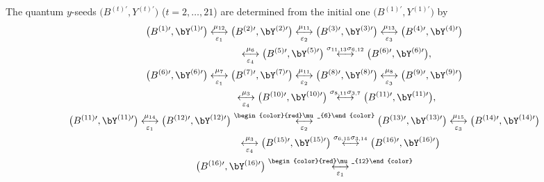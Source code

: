 The quantum $y$-seeds $\bigl(B^{(t)\prime}, Y^{(t)\prime}\bigr)$
($t=2, \dots, 21$) are determined from the initial one
$\bigl(B^{(1)\prime},\allowbreak Y^{(1)\prime}\bigr)$ by
\begin{gather}
\bigl(B^{(1)\prime}, \bY^{(1)\prime}\bigr) \underset{\varepsilon_1}{\overset{\mu_{12}}{\longleftrightarrow}}
\bigl(B^{(2)\prime}, \bY^{(2)\prime}\bigr) \underset{\varepsilon_2}{\overset{\mu_{11}}{\longleftrightarrow}}
\bigl(B^{(3)\prime}, \bY^{(3)\prime}\bigr) \underset{\varepsilon_3}{\overset{\mu_{13}}{\longleftrightarrow}}
\bigl(B^{(4)\prime}, \bY^{(4)\prime}\bigr)\nonumber
\\
\phantom{\bigl(B^{(1)\prime}, \bY^{(1)\prime}\bigr) }{}
\underset{\varepsilon_4}{\overset{\mu_{6}}{\longleftrightarrow}}
\bigl(B^{(5)\prime}, \bY^{(5)\prime}\bigr) \overset{\sigma_{11,13}\sigma_{6,12}}{\longleftrightarrow}
\bigl(B^{(6)\prime}, \bY^{(6)\prime}\bigr),\nonumber
\\
\bigl(B^{(6)\prime}, \bY^{(6)\prime}\bigr) \underset{\varepsilon_1}{\overset{\mu_{7}}{\longleftrightarrow}}
\bigl(B^{(7)\prime}, \bY^{(7)\prime}\bigr) \underset{\varepsilon_2}{\overset{\mu_{11}}{\longleftrightarrow}}
\bigl(B^{(8)\prime}, \bY^{(8)\prime}\bigr) \underset{\varepsilon_3}{\overset{\mu_{8}}{\longleftrightarrow}}
\bigl(B^{(9)\prime}, \bY^{(9)\prime}\bigr)\nonumber
\\
\phantom{\bigl(B^{(6)\prime}, \bY^{(6)\prime}\bigr)}{}
\underset{\varepsilon_4}{\overset{\mu_{3}}{\longleftrightarrow}}
\bigl(B^{(10)\prime}, \bY^{(10)\prime}\bigr) \overset{\sigma_{8,11}\sigma_{3,7}}{\longleftrightarrow}
\bigl(B^{(11)\prime}, \bY^{(11)\prime}\bigr),\nonumber
\\
\bigl(B^{(11)\prime}, \bY^{(11)\prime}\bigr) \underset{\varepsilon_1}{\overset{\mu_{14}}{\longleftrightarrow}}
\bigl(B^{(12)\prime}, \bY^{(12)\prime}\bigr) \underset{\varepsilon_2}{\overset{\begin{color}{red}\mu_{6}\end{color}}{\longleftrightarrow}}
\bigl(B^{(13)\prime}, \bY^{(13)\prime}\bigr) \underset{\varepsilon_3}{\overset{\mu_{15}}{\longleftrightarrow}}
\bigl(B^{(14)\prime}, \bY^{(14)\prime}\bigr)\nonumber
\\
\phantom{\bigl(B^{(11)\prime}, \bY^{(11)\prime}\bigr)}{}
\underset{\varepsilon_4}{\overset{\mu_{3}}{\longleftrightarrow}}
\bigl(B^{(15)\prime}, \bY^{(15)\prime}\bigr) \overset{\sigma_{6,15}\sigma_{3,14}}{\longleftrightarrow}
\bigl(B^{(16)\prime}, \bY^{(16)\prime}\bigr)\nonumber
\\
\bigl(B^{(16)\prime}, \bY^{(16)\prime}\bigr) \underset{\varepsilon_1}{\overset{\begin{color}{red}\mu_{12}\end{color}}{\longleftrightarrow} }

\end{gather}
